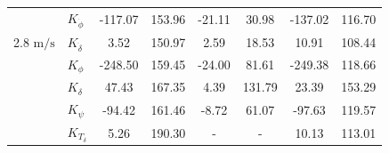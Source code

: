 \begin{table}[]
\begin{tabular}{llcccccc}
                                                   & $K_{\dot{\phi}} $                                      & -117.07                                     & 153.96                                               & -21.11                                      & 30.98                                                & -137.02                                     & 116.70                                               \\
    \multirow{-2}{*}{2.8 $\si{\meter\per\second}$} & $K_{\dot{\delta}}$                                     & 3.52                                        & 150.97                                               & 2.59                                        & 18.53                                                & 10.91                                       & 108.44                                               \\
                                                   & $K_{\phi} $                                            & -248.50                                     & 159.45                                               & -24.00                                      & 81.61                                                & -249.38                                     & 118.66                                               \\
                                                   & $K_\delta $                                            & 47.43                                       & 167.35                                               & 4.39                                        & 131.79                                               & 23.39                                       & 153.29                                               \\
                                                   & $K_\psi $                                              & -94.42                                      & 161.46                                               & -8.72                                       & 61.07                                                & -97.63                                      & 119.57                                               \\
                                                   & $K_{T_\delta}$                                         & 5.26                                        & 190.30                                               & -                                           & -                                                    & 10.13                                       & 113.01                                               \\ \cline{2-8} 

\end{tabular}
\end{table}
